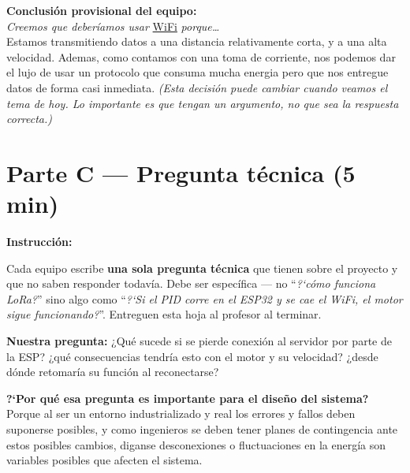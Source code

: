 \documentclass[11pt, letterpaper]{article}
\newenvironment{instruccion}{%
  \begin{mdframed}[backgroundcolor=tealLight, linecolor=tealMain, linewidth=1pt,
    innerleftmargin=10pt, innerrightmargin=10pt,
    innertopmargin=6pt,  innerbottommargin=6pt]
  \small\textbf{\color{tealMain}Instrucci\'on:}\hspace{4pt}
}{\end{mdframed}}
\begin{document}
\vspace{0.3cm}
\begin{mdframed}[backgroundcolor=purpleLight, linecolor=purpleMain, linewidth=1.5pt,
  innerleftmargin=12pt, innerrightmargin=12pt,
  innertopmargin=8pt,  innerbottommargin=8pt]
  \textbf{\color{purpleMain}Conclusi\'on provisional del equipo:}\\[0.5em]
  \textit{Creemos que deber\'iamos usar}
  \underline{WiFi}
  \textit{porque\ldots}\\[0.4em]
  Estamos transmitiendo datos a una distancia relativamente corta, y a una alta velocidad. Ademas, como contamos con una toma de corriente, nos podemos dar el lujo de usar un protocolo que consuma mucha energia pero que nos entregue datos de forma casi inmediata.
  \small\textit{(Esta decisi\'on puede cambiar cuando veamos el tema de hoy.
  Lo importante es que tengan un argumento, no que sea la respuesta correcta.)}
\end{mdframed}

\newpage

\section{Parte C --- Pregunta técnica (5 min)}

\begin{instruccion}
  Cada equipo escribe \textbf{una sola pregunta t\'ecnica} que tienen sobre el proyecto
  y que no saben responder todav\'ia. Debe ser espec\'ifica --- no
  ``\textit{?`c\'omo funciona LoRa?}'' sino algo como
  ``\textit{?`Si el PID corre en el ESP32 y se cae el WiFi, el motor sigue
  funcionando?}''. Entreguen esta hoja al profesor al terminar.
\end{instruccion}

\vspace{0.5cm}

\textbf{Nuestra pregunta:}
¿Qu\'e sucede si se pierde conexión al servidor por parte de la ESP? ¿qué consecuencias tendría esto con el motor y su velocidad? ¿desde dónde retomaría su función al reconectarse?

\vspace{0.5cm}

\textbf{?`Por qu\'e esa pregunta es importante para el dise\~no del sistema?}
Porque al ser un entorno industrializado y real los errores y fallos deben suponerse posibles, y como ingenieros se deben tener planes de contingencia ante estos posibles cambios, diganse desconexiones o fluctuaciones en la energía son variables posibles que afecten el sistema.
\end{document}
